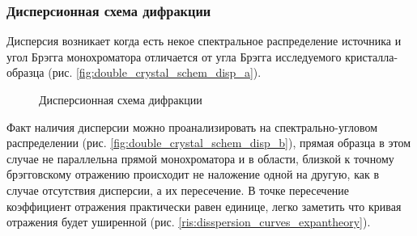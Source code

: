 \subsubsection{Дисперсионная схема дифракции}
  Дисперсия возникает когда есть некое спектральное распределение источника и
   угол Брэгга монохроматора отличается от угла Брэгга исследуемого кристалла-образца
   (рис. \ref{fig:double_crystal_schem_disp_a}).
  \begin{figure}[H]
    \centering
    \hfill
    \caption{Дисперсионная схема дифракции}
    \label{ris:double_crystal_schem_disp}
  \end{figure}
  Факт наличия дисперсии можно проанализировать на спектрально-угловом распределении
  (рис. \ref{fig:double_crystal_schem_disp_b}), прямая образца в этом случае не параллельна прямой монохроматора и
  в области, близкой к точному брэгговскому отражению происходит не наложение одной на другую, как в случае отсутствия дисперсии,
  а их пересечение. В точке пересечение коэффициент отражения практически равен единице,
  легко заметить что кривая отражения будет уширенной (рис. \ref{ris:disspersion_curves_expantheory}).
